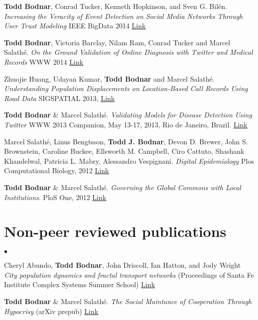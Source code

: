 \documentclass[margin,line]{res}
\newcommand{\linkToUrl}[1]{{\color{blue}\underline{\href{#1}{Link}}}}
\newenvironment{list2}{
  \begin{list}{$\bullet$}{%
      \setlength{\itemsep}{0in}
      \setlength{\parsep}{0in} \setlength{\parskip}{0in}
      \setlength{\topsep}{0in} \setlength{\partopsep}{0in} 
      \setlength{\leftmargin}{10pt}}}{\end{list}}
\begin{document}
\begin{resume}
\begin{etaremune}[start=7,leftmargin=13pt]
\item \textbf{Todd Bodnar}, Conrad Tucker, Kenneth Hopkinson, and Sven G. Bil\'en. \textit{Increasing the Veracity of Event Detection on Social Media Networks Through User Trust Modeling} IEEE BigData 2014 \linkToUrl{http://bit.ly/18RqYCR}

\item \textbf{Todd Bodnar}, Victoria Barclay, Nilam Ram, Conrad Tucker and Marcel Salath\'e. \textit{On the Ground Validation of Online Diagnosis with Twitter and Medical Records} WWW 2014 \linkToUrl{http://bit.ly/R82tZp}

\item Zhuojie Huang, Udayan Kumar, \textbf{Todd Bodnar} and Marcel Salath\'e. \textit{Understanding Population Displacements on Location-Based Call Records Using Road Data} SIGSPATIAL 2013, \linkToUrl{http://bit.ly/1dAjC5o}

\item \textbf{Todd Bodnar} \& Marcel Salath\'e. \textit{Validating Models for Disease Detection Using Twitter}  WWW 2013 Companion, May 13-17, 2013, Rio de Janeiro, Brazil. \linkToUrl{http://bit.ly/WWL1Gr}

\item Marcel Salath\'e, Linus Bengtsson, \textbf{Todd J. Bodnar}, Devon D. Brewer, John S. Brownstein, Caroline Buckee, Ellsworth M. Campbell, Ciro Cattuto, Shashank Khandelwal, Patricia L. Mabry,  Alessandro Vespignani. \textit{Digital Epidemiology} Plos Computational Biology, 2012 \linkToUrl{http://bitly.com/PO2fSx}

\item \textbf{Todd Bodnar} \& Marcel Salath\'e. \textit{Governing the Global Commons with Local Institutions}. PloS One, 2012 \linkToUrl{http://bit.ly/TtsZd5}
\end{etaremune}

\section{\sc Non-peer reviewed publications}

\begin{list2}
\item Cheryl Abundo, \textbf{Todd Bodnar}, John Driscoll, Ian Hatton, and Jody Wright
 \textit{City population dynamics and fractal transport networks} (Proceedings of Santa Fe Institute Complex Systems Summer School) \linkToUrl{bit.ly/19A22vY}%
\item \textbf{Todd Bodnar} \& Marcel Salath\'e. \textit{The Social Maintance of Cooperation Through Hypocrisy} (arXiv prepub) \linkToUrl{http://bit.ly/Yr965L}
\end{list2}


\end{resume}
\end{document}
